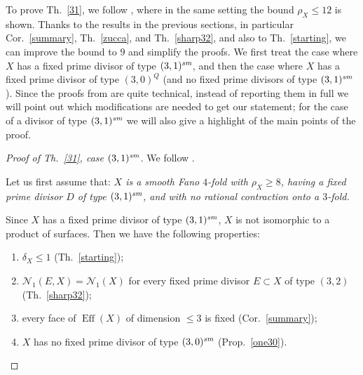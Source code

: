 \documentclass[a4paper,12pt]{amsart}
\theoremstyle{definition}
\numberwithin{figure}{section}
\numberwithin{table}{section}
\newcommand{\N}{\mathcal{N}_1}
\newcommand{\Eff}{\operatorname{Eff}}
\newcommand{\sm}{\text{\it sm}}
\begin{document}
To prove Th.~\ref{31}, we follow \cite[proofs of Th.~8.1 and Th.~9.1]{small}, where in the same setting the bound $\rho_X\leq 12$ is shown. Thanks to the results in the previous sections, in particular Cor.~\ref{summary}, Th.~\ref{zucca}, and Th.~\ref{sharp32}, and also to Th.~\ref{starting}, we can improve the bound to $9$  and simplify the proofs.
We first treat the case where $X$ has a fixed prime divisor of type $(3,1)^{\sm}$, and then the case where $X$ has a fixed prime divisor of type $(3,0)^{Q}$ (and no fixed prime divisors of type $(3,1)^{\sm}$).
Since the proofs from \cite{small} are quite technical, instead of reporting them in full we will 
point out  which modifications are needed to get our  statement; for the case of a divisor of type $(3,1)^{\sm}$ we will also give a highlight of the main points of the proof.
\begin{proof}[Proof of Th.~\ref{31}, case $(3,1)^{\sm}$]
  We follow \cite[proof of Th.~8.1]{small}. 

  Let us first assume that: \emph{$X$ is a smooth Fano $4$-fold with $\rho_X\geq 8$, having a fixed prime divisor $D$ of type $(3,1)^{\sm}$, and
  with no rational contraction onto a $3$-fold.}
  
Since $X$ has a fixed prime divisor of type $(3,1)^{\sm}$, $X$ is not isomorphic to a product of surfaces.
  Then we have the following properties:
  \begin{enumerate}[$\bullet$]
    \item $\delta_X\leq 1$ (Th.~\ref{starting});
    \item 
  $\N(E,X)=\N(X)$ for every fixed prime divisor $E\subset X$ of type $(3,2)$
  (Th.~\ref{sharp32});
\item every face of $\Eff(X)$ of dimension $\leq 3$ is fixed (Cor.~\ref{summary});
  \item $X$ has no fixed prime divisor of type $(3,0)^{\sm}$  (Prop.~\ref{one30}).
\end{enumerate}


\end{proof}
\end{document}
